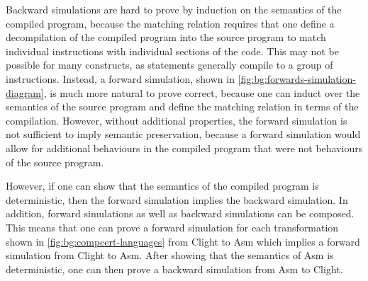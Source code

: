 Backward simulations are hard to prove by induction on the semantics of the
compiled program, because the matching relation requires that one define a
decompilation of the compiled program into the source program to match
individual instructions with individual sections of the code.  This may not be
possible for many constructs, as statements generally compile to a group of
instructions.  Instead, a forward simulation, shown in
\cref{fig:bg:forwards-simulation-diagram}, is much more natural to prove
correct, because one can induct over the semantics of the source program and
define the matching relation in terms of the compilation.  However, without
additional properties, the forward simulation is not sufficient to imply
semantic preservation, because a forward simulation would allow for additional
behaviours in the compiled program that were not behaviours of the source
program.

However, if one can show that the semantics of the compiled program is
deterministic, then the forward simulation implies the backward simulation.
In addition, forward simulations as well as backward simulations can be
composed.  This means that one can prove a forward simulation for each
transformation shown in \cref{fig:bg:compcert-languages} from \gls{Clight} to
\gls{Asm} which implies a forward simulation from Clight to \gls{Asm}.  After
showing that the semantics of \gls{Asm} is deterministic, one can then prove a
backward simulation from \gls{Asm} to \gls{Clight}.


